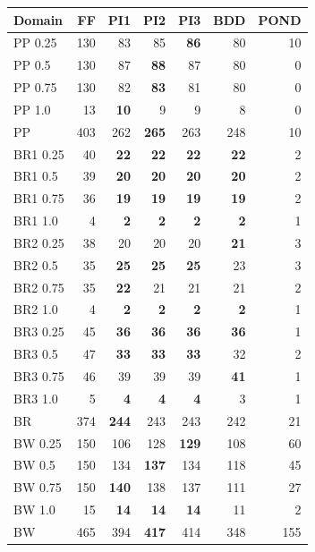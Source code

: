 \documentclass[letterpaper]{article}
\begin{document}
\begin{table}[t]				\centering																				
\begin{tabular}{|l|r|r@{ }r@{ }r@{ }r|r|}																								
\hline																								
Domain	&		FF		&		PI1		&		PI2		&		PI3		&		BDD		&	POND	\\ \hline	\hline
PP 0.25	&		130		&		83		&		85		&	{\bf	86}	&		80		&	10	\\	
PP 0.5	&		130		&		87		&	{\bf	88}	&		87		&		80		&	0	\\	
PP 0.75	&		130		&		82		&	{\bf	83}	&		81		&		80		&	0	\\	
PP 1.0	&		13		&	{\bf	10}	&		9		&		9		&		8		&	0	\\	\hline
PP	&		403		&		262		&	{\bf	265}	&		263		&		248		&	10	\\	\hline\hline
BR1 0.25 	&		40		&	{\bf	22}	&	{\bf	22}	&	{\bf	22}	&	{\bf	22}	&	2	\\	
BR1 0.5 	&		39		&	{\bf	20}	&	{\bf	20}	&	{\bf	20}	&	{\bf	20}	&	2	\\	
BR1 0.75 	&		36		&	{\bf	19}	&	{\bf	19}	&	{\bf	19}	&	{\bf	19}	&	2	\\	
BR1 1.0 	&		4		&	{\bf	2}	&	{\bf	2}	&	{\bf	2}	&	{\bf	2}	&	1	\\	
BR2 0.25 	&		38		&		20		&		20		&		20		&	{\bf	21}	&	3	\\	
BR2 0.5 	&		35		&	{\bf	25}	&	{\bf	25}	&	{\bf	25}	&		23		&	3	\\	
BR2 0.75 	&		35		&	{\bf	22}	&		21		&		21		&		21		&	2	\\	
BR2 1.0 	&		4		&	{\bf	2}	&	{\bf	2}	&	{\bf	2}	&	{\bf	2}	&	1	\\	
BR3 0.25 	&		45		&	{\bf	36}	&	{\bf	36}	&	{\bf	36}	&	{\bf	36}	&	1	\\	
BR3 0.5 	&		47		&	{\bf	33}	&	{\bf	33}	&	{\bf	33}	&		32		&	2	\\	
BR3 0.75 	&		46		&		39		&		39		&		39		&	{\bf	41}	&	1	\\	
BR3 1.0 	&		5		&	{\bf	4}	&	{\bf	4}	&	{\bf	4}	&		3		&	1	\\	\hline
BR 	&		374		&	{\bf	244}	&		243		&		243		&		242		&	21	\\	\hline\hline
BW 0.25 	&		150		&		106		&		128		&	{\bf	129}	&		108		&	60	\\	
BW 0.5 	&		150		&		134		&	{\bf	137}	&		134		&		118		&	45	\\	
BW 0.75 	&		150		&	{\bf	140}	&		138		&		137		&		111		&	27	\\	
BW 1.0 	&		15		&	{\bf	14}	&	{\bf	14}	&	{\bf	14}	&		11		&	2	\\	\hline
BW 	&		465		&		394		&	{\bf	417}	&		414		&		348		&	155	\\	\hline\hline

\end{tabular}
\end{table}
\end{document}
